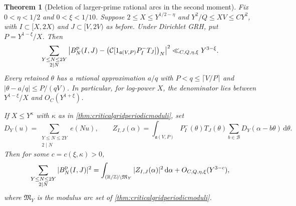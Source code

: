 \documentclass[11pt,a4paper]{article}
\numberwithin{equation}{section}
\newtheorem{theorem}{Theorem}[section]
\newcommand{\ud}{\mathrm d}
\begin{document}
\begin{theorem}[Deletion of larger-prime rational arcs in the second moment]
\label{thm:criticalgriddualmajor}
Fix $0<\eta<1/2$ and $0<\xi<1/10$.
Suppose $2\le X\le Y^{1/2-\eta}$ and $Y^2/Q\le XV\le CY^2$,
with $I\subset[X,2X)$ and $J\subset[V,2V)$ as before.
Under Dirichlet GRH, put $P=Y^{1-\xi}/X$. Then
\begin{equation}
 \sum_{\substack{Y\le N\le2Y\\2\mid N}}
    \left|B_N^{\rm p}(I,J)
      -\bigl(\mathcal C[
        1_{\mathfrak a(V,P)}P_I^- T_J]\bigr)_N\right|^2
      \ll_{C,Q,\eta,\xi}Y^{3-\xi}.
 \label{eq:criticalgriddualmajor}
\end{equation}
Every retained $\theta$ has a rational approximation
$a/q$ with $P<q\le\lceil V/P\rceil$ and
$|\theta-a/q|\le P/(qV)$. In particular, for log-power
$X$, the denominator lies between $Y^{1-\xi}/X$ and
$O_C(Y^{1+\xi})$.

If $X\le Y^\kappa$ with $\kappa$ as in
\cref{thm:criticalgridperiodicmoduli}, set
\[
 D_Y(u)=\sum_{\substack{Y\le N\le2Y\\2\mid N}}e(Nu),\qquad
 Z_{I,J}(\alpha)
   =\int_{\mathfrak a(V,P)} P_I^-(\theta)T_J(\theta)
        \sum_{b\in\mathcal B}D_Y(\alpha-b\theta)\,\ud\theta .
\]
Then for some $c=c(\xi,\kappa)>0$,
\begin{equation}
 \sum_{\substack{Y\le N\le2Y\\2\mid N}} |B_N^{\rm p}(I,J)|^2
   =\int_{(\mathbb R/\mathbb Z)\setminus\mathfrak M_Y}
          |Z_{I,J}(\alpha)|^2\,\ud\alpha
      +O_{C,Q,\eta,\xi}(Y^{3-c}),
 \label{eq:criticalgridjointminor}
\end{equation}
where $\mathfrak M_Y$ is the modulus arc set of
\cref{thm:criticalgridperiodicmoduli}.
\end{theorem}
\end{document}

